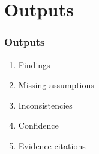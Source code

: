 % 

\section{Outputs}
\begin{frame}\frametitle{Outputs}
	\begin{enumerate}
		\item Findings
		\item Missing assumptions
		\item Inconsistencies
		\item Confidence
		\item Evidence citations
	\end{enumerate}
\end{frame}

\endinput  %

\subsection{A}
\begin{frame}\frametitle{Title}
\center
	Slide content
\end{frame}

\subsection{B}
\begin{frame}\frametitle{Title}
\center
	Slide content
\end{frame}

\endinput  %
